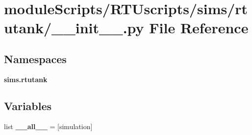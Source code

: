 \section{module\+Scripts/\+R\+T\+Uscripts/sims/rtutank/\+\_\+\+\_\+init\+\_\+\+\_\+.py File Reference}
\label{sims_2rtutank_2____init_____8py}
\subsection*{Namespaces}
\begin{DoxyCompactItemize}
\item 
 {\bf sims.\+rtutank}
\end{DoxyCompactItemize}
\subsection*{Variables}
\begin{DoxyCompactItemize}
\item 
list {\bf \+\_\+\+\_\+all\+\_\+\+\_\+} = [\textquotesingle{}simulation\textquotesingle{}]
\end{DoxyCompactItemize}
